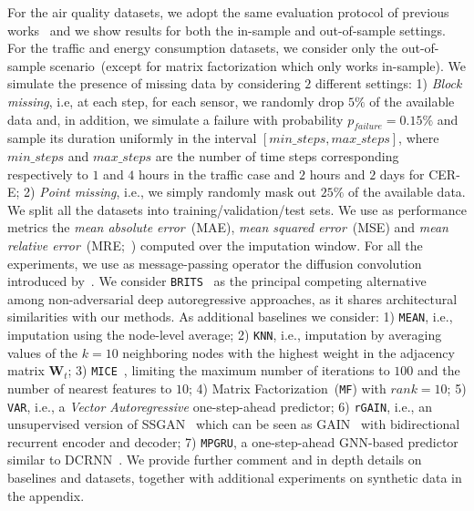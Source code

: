 \documentclass{article} \usepackage{iclr2022_conference,times}
\def\mW{{\bm{W}}}
\begin{document}
For the air quality datasets, we adopt the same evaluation protocol of previous works~\citep{yi2016stmvl, cao2018brits} and we show results for both the in-sample and out-of-sample settings. For the traffic and energy consumption datasets, we consider only the out-of-sample scenario~(except for matrix factorization which only works in-sample). We simulate the presence of missing data by considering $2$ different settings: 1) \textit{Block missing}, i.e, at each step, for each sensor, we randomly drop $5\%$ of the available data and, in addition, we simulate a failure with probability $p_{failure} = 0.15\%$ and sample its duration uniformly in the interval $[min\_steps, max\_steps]$, where $min\_steps$ and $max\_steps$ are the number of time steps corresponding respectively to $1$ and $4$ hours in the traffic case and $2$ hours and $2$ days for CER-E; 2) \textit{Point missing}, i.e., we simply randomly mask out $25\%$ of the available data. We split all the datasets into training/validation/test sets. We use as performance metrics the \emph{mean absolute error}~(MAE), \emph{mean squared error}~(MSE) and \emph{mean relative error}~(MRE;~\citealp{cao2018brits}) computed over the imputation window.
For all the experiments, we use as message-passing operator the diffusion convolution introduced by~\citet{atwood2016diffusion}. We consider \texttt{BRITS}~\citep{cao2018brits} as the principal competing alternative among non-adversarial deep autoregressive approaches, as it shares architectural similarities with our methods.  As additional baselines we consider: 1) \texttt{MEAN}, i.e., imputation using the node-level average; 2) \texttt{KNN}, i.e., imputation by averaging values of the $k=10$ neighboring nodes with the highest weight in the adjacency matrix $\mW_t$; 3) \texttt{MICE}~\citep{white2011multiple}, limiting the maximum number of iterations to $100$ and the number of nearest features to $10$; 4) Matrix Factorization~(\texttt{MF}) with $rank=10$; 5) \texttt{VAR}, i.e., a \textit{Vector Autoregressive} one-step-ahead predictor; 6) \texttt{rGAIN}, i.e., an unsupervised version of SSGAN~\citep{miao2021generative} which can be seen as GAIN~\citep{yoon2018gain} with bidirectional recurrent encoder and decoder; 7) \texttt{MPGRU}, a one-step-ahead GNN-based predictor similar to DCRNN~\citep{li2018diffusion}. We provide further comment and in depth details on baselines and datasets, together with additional experiments on synthetic data in the appendix.
\end{document}
